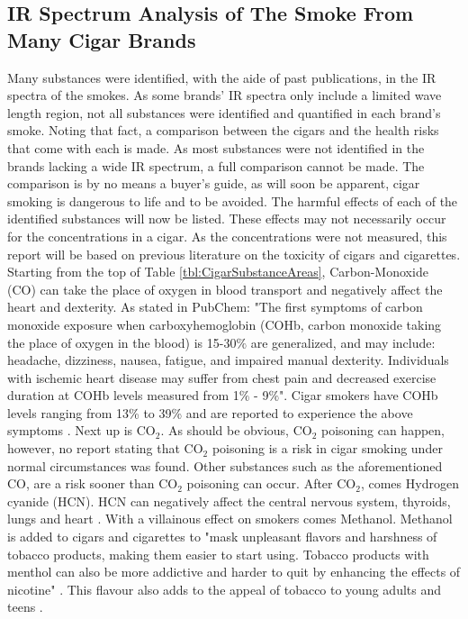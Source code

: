 \documentclass[reprint,amsmath,amssymb,aps, prl]{revtex4-2}
\begin{document}
\subsection{IR Spectrum Analysis of The Smoke From Many Cigar Brands}
Many substances were identified, with the aide of past publications, in the IR spectra of the smokes. As some brands' IR spectra only include a limited wave length region, not all substances were identified and quantified in each brand's smoke.
Noting that fact, a comparison between the cigars and the health risks that come with each is made. As most substances were not identified in the brands lacking a wide IR spectrum, a full comparison cannot be made. The comparison is by no means a buyer's guide, as will soon be apparent, cigar smoking is dangerous to life and to be avoided.
The harmful effects of each of the identified substances will now be listed. These effects may not necessarily occur for the concentrations in a cigar. As the concentrations were not measured, this report will be based on previous literature on the toxicity of cigars and cigarettes.
Starting from the top of Table \ref{tbl:CigarSubstanceAreas}, Carbon-Monoxide (CO) can take the place of oxygen in blood transport and negatively affect the heart \cite{SubstanceDangerPaper} and dexterity.
As stated in PubChem\cite{PubChemCO}: "The first symptoms of carbon monoxide exposure when carboxyhemoglobin (COHb, carbon monoxide taking the place of oxygen in the blood) is 15-30$\%$ are generalized, and may include: headache, dizziness, nausea, fatigue, and impaired manual dexterity. Individuals with ischemic heart disease may suffer from chest pain and decreased exercise duration at COHb levels measured from 1$\%$ - 9$\%$". Cigar smokers have COHb levels ranging from 13\% to 39\% and are reported to experience the above symptoms \cite{COHbInSmokers}.
Next up is $\text{CO}_{2}$. As should be obvious, $\text{CO}_{2}$ poisoning can happen, however, no report stating that $\text{CO}_{2}$ poisoning is a risk in cigar smoking under normal circumstances was found. Other substances such as the aforementioned CO, are a risk sooner than $\text{CO}_{2}$ poisoning can occur.
After $\text{CO}_{2}$, comes Hydrogen cyanide (HCN). HCN can negatively affect the central nervous system, thyroids, lungs and heart \cite{SubstanceDangerPaper}\cite{PubChemHCN}.
With a villainous effect on smokers comes Methanol. Methanol is added to cigars and cigarettes to "mask unpleasant flavors and harshness of tobacco products, making them easier to start using. Tobacco products with menthol can also be more addictive and harder to quit by enhancing the effects of nicotine" \cite{MethanolFDA}. This flavour also adds to the appeal of tobacco to young adults and teens \cite{MethanolFDA}.
\end{document}

